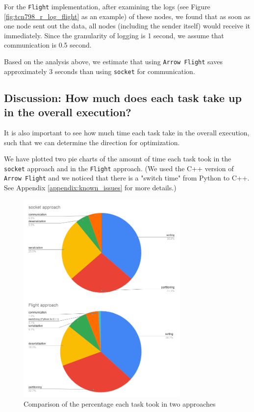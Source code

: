 \documentclass{article}
\begin{document}
For the \texttt{Flight} implementation, after examining the logs (see Figure \ref{fig:tcn798_r_log_flight} as an example) of these nodes, 
we found that as soon as one node sent out the data, all nodes (including the sender itself) would receive it immediately.
Since the granularity of logging is 1 second, we assume that communication is 0.5 second.

Based on the analysis above, we estimate that using \texttt{Arrow Flight} saves approximately 3 seconds than using \texttt{socket} for communication.

\subsection{Discussion: How much does each task take up in the overall execution?}

It is also important to see how much time each task take in the overall execution,
such that we can determine the direction for optimization.

We have plotted two pie charts of the amount of time each task took in the \texttt{socket} approach and in the \texttt{Flight} approach.
(We used the C++ version of \texttt{Arrow Flight} and we noticed that there is a "switch time" from Python to C++.
See Appendix \ref{appendix:known_issues} for more details.)


\begin{figure}[h!]
  \centering
  \includegraphics[width=0.75\textwidth]{pie_chart_socket_vs_flight}
  \caption{Comparison of the percentage each task took in two approaches}
  \label{fig:pie_chart_socket_vs_flight}
\end{figure}
\end{document}
